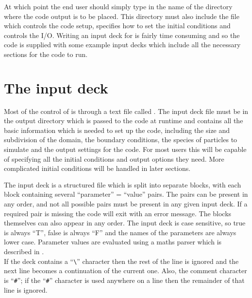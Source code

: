 At which point the end user should simply type in the name of the directory
where the code output is to be placed. This directory must also include the
file  which controls the code setup, specifies how to set the
initial conditions and controls the I/O. Writing an input deck for {\EPOCH} is
fairly time consuming and so the code is supplied with some example input decks
which include all the necessary sections for the code to run.

\section{The {\EPOCH} input deck}
\label{sec:input}
Most of the control of {\EPOCH} is through a text file called .
The input deck file must be in the output directory which is passed to the
code at runtime and contains all the basic
information which is needed to set up the code, including the size and
subdivision of the domain, the boundary conditions, the species of particles to
simulate and the output settings for the code. For most users this will be
capable of specifying all the initial conditions and output options they need.
More complicated initial conditions will be handled in later sections.

The input deck is a structured
file which is split into separate blocks, with each block containing several
``parameter'' = ``value'' pairs. The pairs can be present in any order, and not
all possible pairs must be present in any given input deck. If a required pair
is missing the code will exit with an error message. The blocks themselves can
also appear in any order. The input deck is case
sensitive, so true is always ``T'', false is always ``F'' and the names of
the parameters are always lower case.
Parameter values are evaluated using a maths parser which is described in
.\\

If the deck contains a ``\verb|\|'' character then the rest of the line
is ignored and the next line becomes a continuation of the current one. Also,
the comment character is ``\verb|#|''; if the ``\verb|#|'' character is used
anywhere on a line then the remainder of that line is ignored.\\


